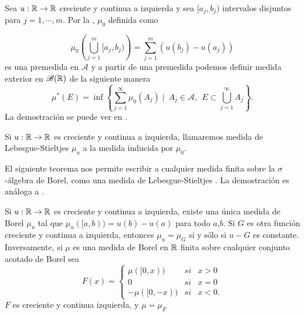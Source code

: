 Sea $u:\mathbb{R} \to \mathbb{R}$  creciente y continua a izquierda y sea $[a_j,b_j)$ intervalos disjuntos para $j=1, \cdots ,m$. Por la \cite[Proposición 1.15]{folland},  $\mu_{0}$ definida como 

$$\mu_{0}\left( \bigcup_{j=1}^m[a_j,b_j)\right)  =\sum_{j=1}^{m}\left(u(b_j)-u(a_j)\right) $$
es una premedida  en $\mathcal{A}$ y a partir de una premedida podemos definir  medida exterior en $\mathscr{B}(\mathbb{R})$ de la siguiente manera 
$$\mu^{*}(E)=\inf\left\lbrace \sum_{ j=1 }^{\infty}\mu_{0}(A_j) \mid \ A_j\in \mathcal{A}, \ \  E\subset\bigcup_{j=1}^{\infty}A_j \right\rbrace. $$\index[Simbolo]{$\mu^{*}$}
La demostración se puede ver en \cite[Proposición 1.13]{folland}.
\begin{defi}
	Si $u:\mathbb{R} \to \mathbb{R}$ es creciente y continua a izquierda, llamaremos medida de Lebesgue-Stieltjes $\mu_{u}$ a la medida inducida por $\mu_{0}$. 
\end{defi}

El siguiente teorema nos permite escribir a cualquier medida finita sobre la $\sigma$-álgebra de Borel, como una medida de Lebesgue-Stieltjes  . La demostración es análoga a  \cite[Teorema  1.16]{folland}.

\begin{thm}\label{medidas}
	Si $u:\mathbb{R} \to\mathbb{R}$ es creciente y continua a izquierda, existe una única medida de Borel $\mu_{u}$ tal que $\mu_{u}([a,b))=u(b)-u(a)$ para todo $a$,$b$. Si $G$ es otra función creciente y continua a izquierda, entonces  $\mu_{u}=\mu_{G}$ si y sólo si $u-G$ es constante. Inversamente, si $\mu$ es una medida de Borel  en $\mathbb{R}$ finita sobre cualquier conjunto acotado de Borel sea
	$$F(x)= \left\{ \begin{array}{lcc}
		\mu([0,x)) &   si  & x > 0 \\
		0 &   si  & x = 0 \\
		-\mu([0,-x)) &   si  & x < 0. 
	\end{array}
	\right. $$
	$F$ es creciente y continua izquierda, y $\mu=\mu_{F}$
\end{thm}  




%

